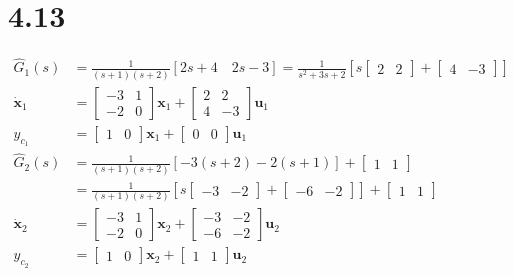\documentclass{article}
\begin{document}
\section*{4.13}
$$
\begin{aligned}
\hat{G}_{1}(s)&=\frac{1}{(s+1)(s+2)}[2 s+4 \quad 2 s-3]=\frac{1}{s^{2}+3 s+2}\left[s\left[\begin{array}{cc}
2 & 2
\end{array}\right]+\left[\begin{array}{cc}
4 & -3
\end{array}\right]\right] \\
\dot{\pmb{x}}_{1}&=\left[\begin{array}{cc}
-3 & 1 \\
-2 & 0
\end{array}\right] \pmb{x}_{1}+\left[\begin{array}{cc}
2 & 2 \\
4 & -3
\end{array}\right] \pmb{u}_{1}\\
y_{c_{1} }&=\left[\begin{array}{ll}1 & 0\end{array}\right] \pmb{x}_{1}+\left[\begin{array}{ll}0 & 0\end{array}\right] \pmb{u}_{1}\\
\hat{G}_{2}(s)&=\frac{1}{(s+1)(s+2)}[-3(s+2)-2(s+1)]+\left[\begin{array}{ll}
1 & 1
\end{array}\right]\\
&=\frac{1}{(s+1)(s+2)}\left[s\left[\begin{array}{ll}
-3 & -2
\end{array}\right]+\left[\begin{array}{ll}
-6 & -2
\end{array}\right]\right]+\left[\begin{array}{ll}
1 & 1
\end{array}\right]\\
\dot{\pmb{x}}_{2}&=\left[\begin{array}{cc}
-3 & 1 \\
-2 & 0
\end{array}\right] \pmb{x}_{2}+\left[\begin{array}{cc}
-3 & -2 \\
-6 & -2
\end{array}\right] \pmb{u}_{2}\\
y_{c_{2}}&=\left[\begin{array}{ll}1 & 0\end{array}\right] \pmb{x}_{2}+\left[\begin{array}{ll}1 & 1\end{array}\right] \pmb{u}_{2}
\end{aligned}
$$
\end{document}
